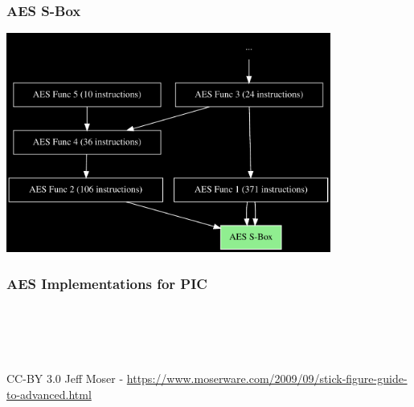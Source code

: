 \documentclass[aspectratio=169]{beamer}
\begin{document}
\begin{frame}
	\frametitle{AES S-Box}

	\begin{center}
		\includegraphics[width=0.8\textwidth]{small-graph-unknown.pdf}
	\end{center}
\end{frame}

\begin{frame}
	\frametitle{AES Implementations for PIC}

	\begin{columns}
		\begin{column}{0.5\textwidth}
		\end{column}
		\begin{column}{0.5\textwidth}
			\\
		\end{column}
	\end{columns}

	~\\

	\tiny{CC-BY 3.0 Jeff Moser - \url{https://www.moserware.com/2009/09/stick-figure-guide-to-advanced.html}}
\end{frame}
\end{document}
